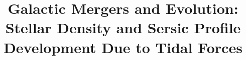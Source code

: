 \documentclass[linenumbers,trackchanges,twocolumn]{aastex7}
\begin{document}
\title{Galactic Mergers and Evolution: Stellar Density and Sersic Profile Development Due to Tidal Forces}

\end{document}
